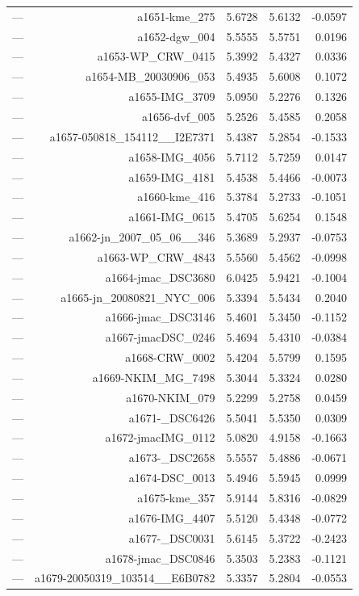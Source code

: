 \begin{table}[htbp]
\begin{tabular}{lrrrr}
— & a1651-kme_275 & 5.6728 & 5.6132 & -0.0597 \\
— & a1652-dgw_004 & 5.5555 & 5.5751 & 0.0196 \\
— & a1653-WP_CRW_0415 & 5.3992 & 5.4327 & 0.0336 \\
— & a1654-MB_20030906_053 & 5.4935 & 5.6008 & 0.1072 \\
— & a1655-IMG_3709 & 5.0950 & 5.2276 & 0.1326 \\
— & a1656-dvf_005 & 5.2526 & 5.4585 & 0.2058 \\
— & a1657-050818_154112__I2E7371 & 5.4387 & 5.2854 & -0.1533 \\
— & a1658-IMG_4056 & 5.7112 & 5.7259 & 0.0147 \\
— & a1659-IMG_4181 & 5.4538 & 5.4466 & -0.0073 \\
— & a1660-kme_416 & 5.3784 & 5.2733 & -0.1051 \\
— & a1661-IMG_0615 & 5.4705 & 5.6254 & 0.1548 \\
— & a1662-jn_2007_05_06__346 & 5.3689 & 5.2937 & -0.0753 \\
— & a1663-WP_CRW_4843 & 5.5560 & 5.4562 & -0.0998 \\
— & a1664-jmac_DSC3680 & 6.0425 & 5.9421 & -0.1004 \\
— & a1665-jn_20080821_NYC_006 & 5.3394 & 5.5434 & 0.2040 \\
— & a1666-jmac_DSC3146 & 5.4601 & 5.3450 & -0.1152 \\
— & a1667-jmacDSC_0246 & 5.4694 & 5.4310 & -0.0384 \\
— & a1668-CRW_0002 & 5.4204 & 5.5799 & 0.1595 \\
— & a1669-NKIM_MG_7498 & 5.3044 & 5.3324 & 0.0280 \\
— & a1670-NKIM_079 & 5.2299 & 5.2758 & 0.0459 \\
— & a1671-_DSC6426 & 5.5041 & 5.5350 & 0.0309 \\
— & a1672-jmacIMG_0112 & 5.0820 & 4.9158 & -0.1663 \\
— & a1673-_DSC2658 & 5.5557 & 5.4886 & -0.0671 \\
— & a1674-DSC_0013 & 5.4946 & 5.5945 & 0.0999 \\
— & a1675-kme_357 & 5.9144 & 5.8316 & -0.0829 \\
— & a1676-IMG_4407 & 5.5120 & 5.4348 & -0.0772 \\
— & a1677-_DSC0031 & 5.6145 & 5.3722 & -0.2423 \\
— & a1678-jmac_DSC0846 & 5.3503 & 5.2383 & -0.1121 \\
— & a1679-20050319_103514__E6B0782 & 5.3357 & 5.2804 & -0.0553 \\

\end{tabular}
\end{table}
